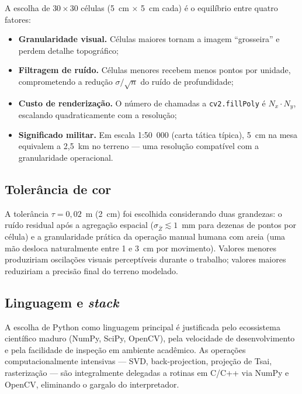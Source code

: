A escolha de $30 \times 30$ células (5~cm$\,\times\,$5~cm cada) é o
equilíbrio entre quatro fatores:

\begin{itemize}
    \item \textbf{Granularidade visual.} Células maiores tornam a
          imagem ``grosseira'' e perdem detalhe topográfico;
    \item \textbf{Filtragem de ruído.} Células menores recebem menos
          pontos por unidade, comprometendo a redução $\sigma/\sqrt{n}$
          do ruído de profundidade;
    \item \textbf{Custo de renderização.} O número de chamadas a
          \texttt{cv2.fillPoly} é $N_x \cdot N_y$, escalando
          quadraticamente com a resolução;
    \item \textbf{Significado militar.} Em escala 1:50~000 (carta
          tática típica), 5~cm na mesa equivalem a 2,5~km no terreno —
          uma resolução compatível com a granularidade operacional.
\end{itemize}

\subsection{Tolerância de cor}

A tolerância $\tau = 0{,}02$~m (2~cm) foi escolhida considerando
duas grandezas: o ruído residual após a agregação espacial
($\sigma_{\bar{Z}} \lesssim 1$~mm para dezenas de pontos por célula) e
a granularidade prática da operação manual humana com areia (uma mão
desloca naturalmente entre 1 e 3~cm por movimento). Valores menores
produziriam oscilações visuais perceptíveis durante o trabalho; valores
maiores reduziriam a precisão final do terreno modelado.

\subsection{Linguagem e \emph{stack}}

A escolha de Python como linguagem principal é justificada pelo
ecossistema científico maduro (NumPy, SciPy, OpenCV), pela velocidade
de desenvolvimento e pela facilidade de inspeção em ambiente
acadêmico. As operações computacionalmente intensivas — SVD,
back-projection, projeção de Tsai, rasterização — são integralmente
delegadas a rotinas em C/C++ via NumPy e OpenCV, eliminando o gargalo
do interpretador.
